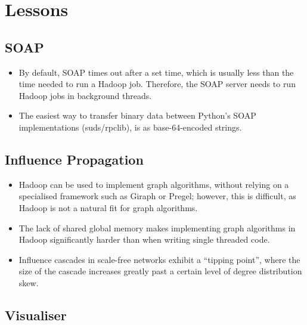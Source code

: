 \section{Lessons}

\subsection{SOAP}

\begin{itemize}
  \item By default, SOAP times out after a set time, which is usually less than the time needed to run a Hadoop job. Therefore, the SOAP server needs to run Hadoop jobs in background threads.
  \item The easiest way to transfer binary data between Python's SOAP implementations (suds/rpclib), is as base-64-encoded strings.
\end{itemize}

\subsection{Influence Propagation}

\begin{itemize}
	\item Hadoop can be used to implement graph algorithms, without relying on a specialised framework such as Giraph or Pregel; however, this is difficult, as Hadoop is not a natural fit for graph algorithms.
	\item The lack of shared global memory makes implementing graph algorithms in Hadoop significantly harder than when writing single threaded code.
        \item Influence cascades in scale-free networks exhibit a ``tipping point'', where the size of the cascade increases greatly past a certain level of degree distribution skew.
\end{itemize}

\subsection{Visualiser}

